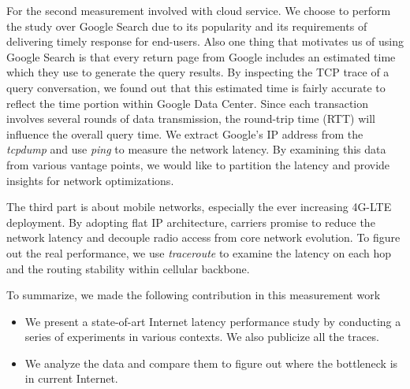 For the second measurement involved with cloud service. We choose to perform the study over Google Search due to its popularity and its requirements of delivering timely response for end-users. Also one thing that motivates us of using Google Search is that every return page from Google includes an estimated time which they use to generate the query results. By inspecting the TCP trace of a query conversation, we found out that this estimated time is fairly accurate to reflect the time portion within Google Data Center. Since each transaction involves several rounds of data transmission, the round-trip time (RTT) will influence the overall query time. We extract Google's IP address from the {\it tcpdump} and use {\it ping} to measure the network latency. By examining this data from various vantage points, we would like to partition the latency and provide insights for network optimizations.

The third part is about mobile networks, especially the ever increasing 4G-LTE deployment. By adopting flat IP architecture, carriers promise to reduce the network latency and decouple radio access from core network evolution. To figure out the real performance, we use {\it traceroute} to examine the latency on each hop and the routing stability within cellular backbone. 

To summarize, we made the following contribution in this measurement work
\begin{itemize}
\item We present a state-of-art Internet latency performance study by conducting a series of experiments in various contexts. We also publicize all the traces.
\item We analyze the data and compare them to figure out where the bottleneck is in current Internet.
\end{itemize}



